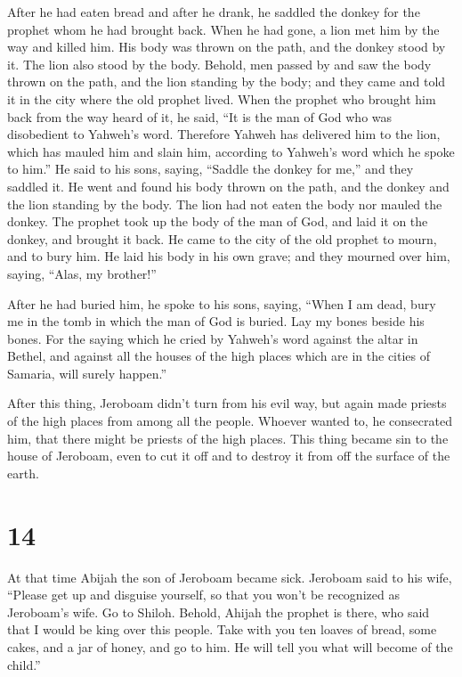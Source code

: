  After he had eaten bread and after he drank, he saddled
the donkey for the prophet whom he had brought back.  When
he had gone, a lion met him by the way and killed him. His body was
thrown on the path, and the donkey stood by it. The lion also stood by
the body.  Behold, men passed by and saw the body thrown on
the path, and the lion standing by the body; and they came and told it
in the city where the old prophet lived.  When the prophet
who brought him back from the way heard of it, he said, ``It is the man
of God who was disobedient to Yahweh's word. Therefore Yahweh has
delivered him to the lion, which has mauled him and slain him, according
to Yahweh's word which he spoke to him.''  He said to his
sons, saying, ``Saddle the donkey for me,'' and they saddled it.
 He went and found his body thrown on the path, and the
donkey and the lion standing by the body. The lion had not eaten the
body nor mauled the donkey.  The prophet took up the body
of the man of God, and laid it on the donkey, and brought it back. He
came to the city of the old prophet to mourn, and to bury him.
 He laid his body in his own grave; and they mourned over
him, saying, ``Alas, my brother!''

 After he had buried him, he spoke to his sons, saying,
``When I am dead, bury me in the tomb in which the man of God is buried.
Lay my bones beside his bones.  For the saying which he
cried by Yahweh's word against the altar in Bethel, and against all the
houses of the high places which are in the cities of Samaria, will
surely happen.''

 After this thing, Jeroboam didn't turn from his evil way,
but again made priests of the high places from among all the people.
Whoever wanted to, he consecrated him, that there might be priests of
the high places.  This thing became sin to the house of
Jeroboam, even to cut it off and to destroy it from off the surface of
the earth.

\hypertarget{section-13}{%
\section{14}\label{section-13}}

 At that time Abijah the son of Jeroboam became sick.
 Jeroboam said to his wife, ``Please get up and disguise
yourself, so that you won't be recognized as Jeroboam's wife. Go to
Shiloh. Behold, Ahijah the prophet is there, who said that I would be
king over this people.  Take with you ten loaves of bread,
some cakes, and a jar of honey, and go to him. He will tell you what
will become of the child.''

